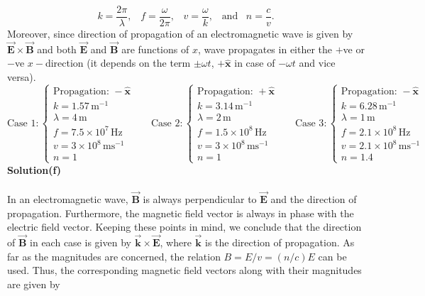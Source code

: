 \documentclass{article}
\begin{document}
\[k=\frac{2\pi}{\lambda},\,\,\,\,\,f=\frac{\omega}{2\pi},\,\,\,\,\,v=\frac{\omega}{k},\,\,\,\,\,\text{and}\,\,\,\,\,n=\frac{c}{v}.\]
Moreover, since direction of propagation of an electromagnetic wave is given by $\boldsymbol{\vec{E}}\times\boldsymbol{\vec{B}}$ and both $\boldsymbol{\vec{E}}$ and $\boldsymbol{\vec{B}}$ are functions of $x$, wave propagates in either the $+$ve or $-$ve $x-$direction (it depends on the term $\pm\omega t$, $+\boldsymbol{\hat{x}}$ in case of $-\omega t$ and vice versa).
\[\text{Case 1}:\begin{cases}
    \text{Propagation: }-\boldsymbol{\hat{x}}
    \\k=1.57\,\text{m}^{-1}
    \\\lambda=4\,\text{m}
    \\f=7.5\times10^7\,\text{Hz}
    \\v=3\times10^8\,\text{ms}^{-1}
    \\n=1
\end{cases}\,\,\,\,\,\,\,\,\,\,\text{Case 2}:\begin{cases}
    \text{Propagation: }+\boldsymbol{\hat{x}}
    \\k=3.14\,\text{m}^{-1}
    \\\lambda=2\,\text{m}
    \\f=1.5\times10^8\,\text{Hz}
    \\v=3\times10^8\,\text{ms}^{-1}
    \\n=1
\end{cases}\,\,\,\,\,\,\,\,\,\,\text{Case 3}:\begin{cases}
    \text{Propagation: }-\boldsymbol{\hat{x}}
    \\k=6.28\,\text{m}^{-1}
    \\\lambda=1\,\text{m}
    \\f=2.1\times10^8\,\text{Hz}
    \\v=2.1\times10^8\,\text{ms}^{-1}
    \\n=1.4
\end{cases}\]
\textbf{Solution(f)}
\\
\\In an electromagnetic wave, $\boldsymbol{\vec{B}}$ is always perpendicular to $\boldsymbol{\vec{E}}$ and the direction of propagation. Furthermore, the magnetic field vector is always in phase with the electric field vector. Keeping these points in mind, we conclude that the direction of $\boldsymbol{\vec{B}}$ in each case is given by $\boldsymbol{\vec{k}}\times\boldsymbol{\vec{E}}$, where $\boldsymbol{\vec{k}}$ is the direction of propagation. As far as the magnitudes are concerned, the relation $B=E/v=(n/c)E$ can be used. Thus, the corresponding magnetic field vectors along with their magnitudes are given by
\end{document}

